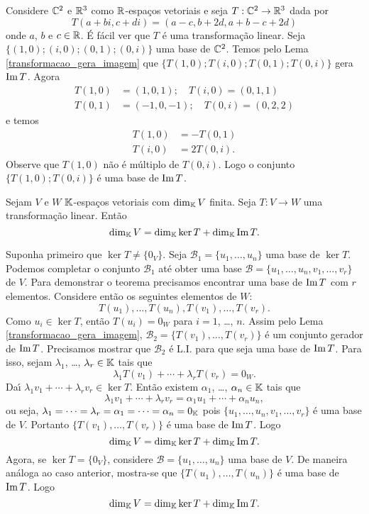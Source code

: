 \begin{exemplo}
  Considere $\mathbb{C}^2$ e $\mathbb{R}^3$ como $\mathbb{R}$-espa\c{c}os vetoriais e seja $T : \mathbb{C}^2 \to \mathbb{R}^3$ dada por
  \[
    T(a+bi, c+di) = (a - c, b + 2d, a + b - c + 2d)
  \]
  onde $a$, $b$ e $c \in \mathbb{R}$. \'E f\'acil ver que $T$ \'e uma transforma\c{c}\~ao linear. Seja $\{(1,0);(i,0);(0,1);(0,i)\}$ uma base de $\mathbb{C}^2$. Temos pelo Lema \ref{transformacao_gera_imagem} que $\{T(1,0);T(i,0);T(0,1);T(0,i)\}$ gera ${\rm Im\,} T$. Agora
  \begin{align*}
    T(1,0) &= (1,0,1);\quad T(i,0) = (0,1,1)\\
    T(0,1) &= (-1,0,-1);\quad T(0,i) = (0,2,2)
  \end{align*}
  e temos
  \begin{align*}
    T(1,0) &= -T(0,1)\\
    T(i,0) &= 2T(0,i).
  \end{align*}
  Observe que $T(1,0)$ n\~ao \'e m\'ultiplo de $T(0,i)$. Logo o conjunto $\{T(1,0); T(0,i)\}$ \'e uma base de ${\rm Im\,} T$.
\end{exemplo}

\begin{teorema}\label{teorema_do_nucleo_e_da_imagem}
  Sejam $V$ e $W$ $\mathbb{K}$-espa\c{c}os vetoriais com $\dim_{\mathbb{K}}V$ finita. Seja $T : V \to W$ uma transforma\c{c}\~ao linear. Ent\~ao
  \[
    \dim_{\mathbb{K}}V = \dim_{\mathbb{K}}\ker T + \dim_{\mathbb{K}}{\rm Im\,} T.
  \]
\end{teorema}
\begin{prova}
  Suponha primeiro que $\ker T \ne \{0_V\}$. Seja $\mathcal{B}_1 = \{u_1, \dots, u_n\}$ uma base de $\ker T$. Podemos completar o conjunto $\mathcal{B}_1$ at\'e obter uma base $\mathcal{B} = \{u_1, \dots, u_n, v_1, \dots, v_r\}$ de $V$. Para demonstrar o teorema precisamos encontrar uma base de ${\rm Im\,} T$ com $r$ elementos. Considere ent\~ao os seguintes elementos de $W$:
  \[
    T(u_1), \dots, T(u_n), T(v_1), \dots, T(v_r).
  \]
  Como $u_i \in \ker T$, ent\~ao $T(u_i) = 0_W$ para $i = 1$, \dots, $n$. Assim pelo Lema \ref{transformacao_gera_imagem}, $\mathcal{B}_2 = \{T(v_1), \dots, T(v_r)\}$ \'e um conjunto gerador de ${\rm Im\,} T$. Precisamos mostrar que $\mathcal{B}_2$ \'e L.I. para que seja uma base de ${\rm Im\,} T$. Para isso, sejam $\lambda_1$, \dots, $\lambda_r \in \mathbb{K}$ tais que
  \[
    \lambda_1T(v_1) + \cdots + \lambda_rT(v_r) = 0_W.
  \]
  Da{\'\i} $\lambda_1v_1 + \cdots + \lambda_rv_r \in \ker T$. Ent\~ao existem $\alpha_1$, \dots, $\alpha_n \in \mathbb{K}$ tais que
  \[
    \lambda_1v_1 + \cdots + \lambda_rv_r = \alpha_1u_1 + \cdots + \alpha_nu_n,
  \]
  ou seja, $\lambda_1 = \cdots = \lambda_r = \alpha_1 = \cdots = \alpha_n = 0_{\mathbb{K}}$ pois $\{u_1, \dots, u_n, v_1, \dots, v_r\}$ \'e uma base de $V$. Portanto $\{T(v_1), \dots, T(v_r)\}$ \'e uma base de ${\rm Im\,} T$. Logo
  \[
    \dim_{\mathbb{K}}V = \dim_{\mathbb{K}}\ker T + \dim_{\mathbb{K}}{\rm Im\,} T.
  \]
  Agora, se $\ker T = \{0_V\}$, considere $\mathcal{B} = \{u_1, \dots, u_n\}$ uma base de $V$. De maneira an\'aloga ao caso anterior, mostra-se que $\{T(u_1), \dots, T(u_n)\}$ \'e uma base de ${\rm Im\,} T$. Logo
  \[
    \dim_{\mathbb{K}}V = \dim_{\mathbb{K}}\ker T + \dim_{\mathbb{K}}{\rm Im\,} T.
  \]
\end{prova}

